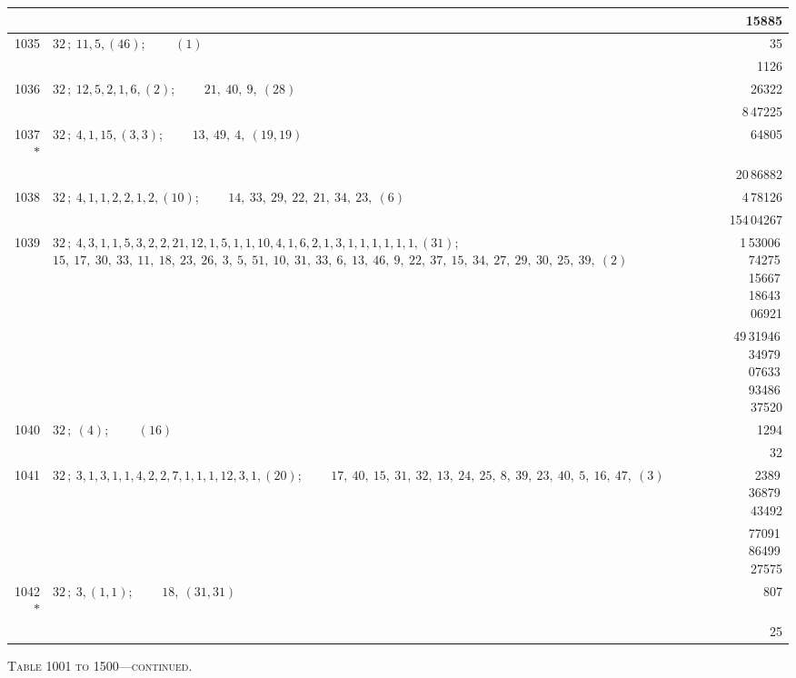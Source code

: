 \documentclass[11pt]{article}
\providecommand{\asterism}{*}
\begin{document}
\begin{longtable}{|r|p{}|r|}
 & & 15885 \\
\hline
1035 & $32\,;\ 11, 5, (46)$; \ \ \ \ $(1)$ & 35 \\
 & & 1126 \\
\hline
1036 & $32\,;\ 12, 5, 2, 1, 6, (2)$; \ \ \ \ $21,\ 40,\ 9,\ (28)$ & 26322 \\
 & & 8\,47225 \\
\hline
1037$\asterism$ & $32\,;\ 4, 1, 15, (3, 3)$; \ \ \ \ $13,\ 49,\ 4,\ (19, 19)$ & 64805 \\
 & & 20\,86882 \\
\hline
1038 & $32\,;\ 4, 1, 1, 2, 2, 1, 2, (10)$; \ \ \ \ $14,\ 33,\ 29,\ 22,\ 21,\ 34,\ 23,\ (6)$ & 4\,78126 \\
 & & 154\,04267 \\
\hline
1039 & $32\,;\ 4, 3, 1, 1, 5, 3, 2, 2, 21, 12, 1, 5, 1, 1, 10, 4, 1, 6, 2, 1, 3, 1, 1, 1, 1, 1, 1, (31)$; \ \ \ \ $15,\ 17,\ 30,\ 33,\ 11,\ 18,\ 23,\ 26,\ 3,\ 5,\ 51,\ 10,\ 31,\ 33,\ 6,\ 13,\ 46,\ 9,\ 22,\ 37,\ 15,\ 34,\ 27,\ 29,\ 30,\ 25,\ 39,\ (2)$ & 1\,53006\,74275\,15667\,18643\,06921 \\
 & & 49\,31946\,34979\,07633\,93486\,37520 \\
\hline
1040 & $32\,;\ (4)$; \ \ \ \ $(16)$ & 1294 \\
 & & 32 \\
\hline
1041 & $32\,;\ 3, 1, 3, 1, 1, 4, 2, 2, 7, 1, 1, 1, 12, 3, 1, (20)$; \ \ \ \ $17,\ 40,\ 15,\ 31,\ 32,\ 13,\ 24,\ 25,\ 8,\ 39,\ 23,\ 40,\ 5,\ 16,\ 47,\ (3)$ & 2389\,36879\,43492 \\
 & & 77091\,86499\,27575 \\
\hline
1042$\asterism$ & $32\,;\ 3, (1, 1)$; \ \ \ \ $18,\ (31, 31)$ & 807 \\
 & & 25 \\
\hline
\end{longtable}

\begin{center}
\small\textsc{Table 1001 to 1500---continued.}
\end{center}
\end{document}

